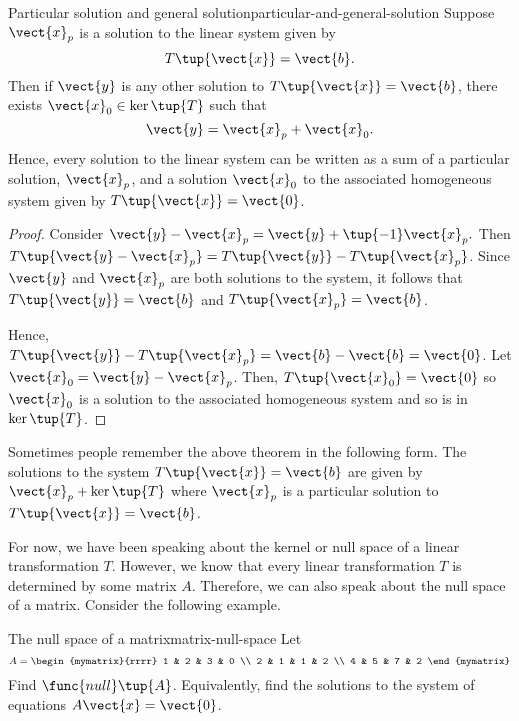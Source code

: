\begin{theorem}{Particular solution and general solution}{particular-and-general-solution}
Suppose $\vect{x}_{p}$ is a solution to the linear system given by
\begin{equation*}
T\tup{\vect{x} } = \vect{b}.
\end{equation*}
Then if $\vect{y}$ is any other solution to $T\tup{\vect{x}}=\vect{b}$, 
 there exists $\vect{x}_0 \in \ker
\tup{T} $ such that
\begin{equation*}
\vect{y} = \vect{x}_{p}+ \vect{x}_0.
\end{equation*}
Hence, every solution to the linear system can be written as a sum of a particular solution, $\vect{x}_p$,
 and a solution $\vect{x}_0$ to the associated 
homogeneous system given by $T\tup{\vect{x}}=\vect{0}$.
\end{theorem}

\begin{proof}
Consider $\vect{y} - \vect{x}_{p}= \vect{y} + \tup{
-1} \vect{x}_{p}.$ Then $T\tup{\vect{y} - \vect{x}_{p}} =T\tup{\vect{y}}
-T\tup{\vect{x}_{p} }$. Since $\vect{y}$ and $\vect{x}_{p}$ are both solutions to the system, it follows that $T\tup{\vect{y}}= \vect{b} $
and $T\tup{\vect{x}_p} = \vect{b}$. 

Hence, $T\tup{\vect{y}}-T\tup{\vect{x}_{p} }
=\vect{b} - \vect{b} = \vect{0}$.  Let $\vect{x}_0 = \vect{y} - \vect{x}_{p}$.
Then, $T\tup{\vect{x}_0}= \vect{0} $ so $\vect{x}_0$ is a solution to the associated homogeneous system and so is in $\ker \tup{T}$.
\end{proof}

Sometimes people remember the above theorem in the following form. The
solutions to the system $T\tup{\vect{x}}=\vect{b}$ are given by 
$\vect{x}_{p}+\ker \tup{T} $ where $\vect{x}_{p}$ is a particular
solution to $T\tup{\vect{x}}=\vect{b}$.

For now, we have been speaking about the kernel or null space of a linear transformation $T$. However, 
we know that every linear transformation $T$ is determined by some matrix $A$. Therefore,
we can also speak about the null space of a matrix. Consider the following example.  

\begin{example}{The null space of a matrix}{matrix-null-space}
Let
\begin{equation*}
A=\begin{mymatrix}{rrrr}
1 & 2 & 3 & 0 \\
2 & 1 & 1 & 2 \\
4 & 5 & 7 & 2
\end{mymatrix}
\end{equation*}
Find $\func{null} \tup{A} $. Equivalently, find the solutions to the
system of equations $A\vect{x}=\vect{0}$.
\end{example}

